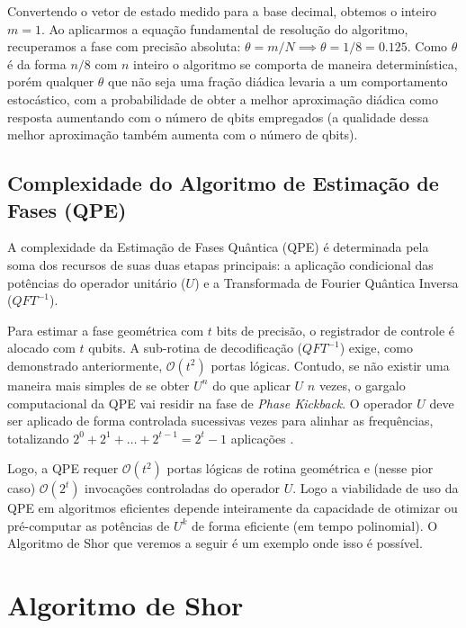 \documentclass[12pt, a4paper]{article}
\begin{document}
Convertendo o vetor de estado medido para a base decimal, obtemos o inteiro $m = 1$. Ao aplicarmos a equação fundamental de resolução do algoritmo, recuperamos a fase com precisão absoluta: $\theta = m/N \implies \theta = 1/8 = 0.125$. Como $\theta$ é da forma $n/8$ com $n$ inteiro o algoritmo se comporta de maneira determinística, porém qualquer $\theta$ que não seja uma fração diádica levaria a um comportamento estocástico, com a probabilidade de obter a melhor aproximação diádica como resposta aumentando com o número de qbits empregados (a qualidade dessa melhor aproximação também aumenta com o número de qbits).

\subsection{Complexidade do Algoritmo de Estimação de Fases (QPE)}

A complexidade da Estimação de Fases Quântica (QPE) é determinada pela soma dos recursos de suas duas etapas principais: a aplicação condicional das potências do operador unitário ($U$) e a Transformada de Fourier Quântica Inversa ($QFT^{-1}$).

Para estimar a fase geométrica com $t$ bits de precisão, o registrador de controle é alocado com $t$ qubits. A sub-rotina de decodificação ($QFT^{-1}$) exige, como demonstrado anteriormente, $\mathcal{O}(t^2)$ portas lógicas. Contudo, se não existir uma maneira mais simples de se obter $U^n$ do que aplicar $U$ $n$ vezes, o gargalo computacional da QPE vai residir na fase de \textit{Phase Kickback}. O operador $U$ deve ser aplicado de forma controlada sucessivas vezes para alinhar as frequências, totalizando $2^0 + 2^1 + \dots + 2^{t-1} = 2^t - 1$ aplicações \cite{nielsen2010}.

Logo, a QPE requer $\mathcal{O}(t^2)$ portas lógicas de rotina geométrica e (nesse pior caso) $\mathcal{O}(2^t)$ invocações controladas do operador $U$. Logo a viabilidade de uso da QPE em algoritmos eficientes depende inteiramente da capacidade de otimizar ou pré-computar as potências de $U^k$ de forma eficiente (em tempo polinomial). O Algoritmo de Shor que veremos a seguir é um exemplo onde isso é possível.

\section{Algoritmo de Shor}
\end{document}
